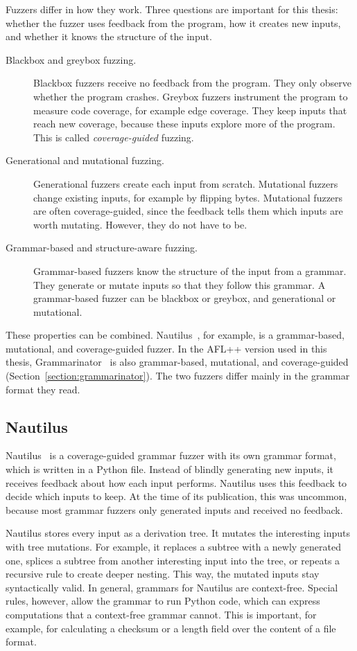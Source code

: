 \documentclass[thesis]{plai}
\begin{document}
Fuzzers differ in how they work. Three questions are important for this thesis: whether the fuzzer uses feedback from the program, how it creates new inputs, and whether it knows the structure of the input.

\begin{description}
    \item[Blackbox and greybox fuzzing.] Blackbox fuzzers receive no feedback from the program. They only observe whether the program crashes. Greybox fuzzers instrument the program to measure code coverage, for example edge coverage. They keep inputs that reach new coverage, because these inputs explore more of the program. This is called \emph{coverage-guided} fuzzing.
    \item[Generational and mutational fuzzing.] Generational fuzzers create each input from scratch. Mutational fuzzers change existing inputs, for example by flipping bytes. Mutational fuzzers are often coverage-guided, since the feedback tells them which inputs are worth mutating. However, they do not have to be.
    \item[Grammar-based and structure-aware fuzzing.] Grammar-based fuzzers know the structure of the input from a grammar. They generate or mutate inputs so that they follow this grammar. A grammar-based fuzzer can be blackbox or greybox, and generational or mutational.
\end{description}

These properties can be combined. Nautilus~\cite{aschermann19-nautilus}, for example, is a grammar-based, mutational, and coverage-guided fuzzer. In the AFL++ version used in this thesis, Grammarinator~\cite{hodovan26-grammarinator-aflpp} is also grammar-based, mutational, and coverage-guided (Section~\ref{section:grammarinator}). The two fuzzers differ mainly in the grammar format they read.
\subsection{Nautilus}
\label{section:nautilus}
Nautilus~\cite{aschermann19-nautilus} is a coverage-guided grammar fuzzer with its own grammar format, which is written in a Python file. Instead of blindly generating new inputs, it receives feedback about how each input performs. Nautilus uses this feedback to decide which inputs to keep. At the time of its publication, this was uncommon, because most grammar fuzzers only generated inputs and received no feedback.

Nautilus stores every input as a derivation tree. It mutates the interesting inputs with tree mutations. For example, it replaces a subtree with a newly generated one, splices a subtree from another interesting input into the tree, or repeats a recursive rule to create deeper nesting. This way, the mutated inputs stay syntactically valid. In general, grammars for Nautilus are context-free. Special rules, however, allow the grammar to run Python code, which can express computations that a context-free grammar cannot. This is important, for example, for calculating a checksum or a length field over the content of a file format.
\end{document}
